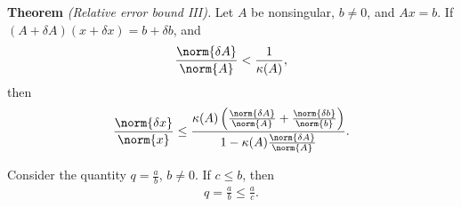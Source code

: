 \documentclass{report}
\title{\Huge{}}
\author{\huge{Nathan Warner}}
\date{\huge{}}
\begin{document}

    \bigbreak \noindent \bigbreak \noindent \bigbreak \noindent 
    \noindent \textbf{Theorem} \textit{\textit{(Relative error bound III).}}  Let $A$ be nonsingular, $b\ne 0$, and $Ax=b$. If $(A + \delta A)(x + \delta x) = b + \delta  b$, and 
        \begin{align*}
            \frac{\norm{\delta  A}}{\norm{A}} < \frac{1}{\kappa(A)},
        \end{align*}
        then
        \begin{align*}
            \frac{\norm{\delta x}}{\norm{x}} \leq \frac{\kappa(A)\left(\frac{\norm{\delta A}}{\norm{A}} + \frac{\norm{\delta b}}{\norm{b}}\right)}{1-\kappa(A)\frac{\norm{\delta A}}{\norm{A}}}
        .\end{align*}
        \bigbreak \noindent 
        \begin{remark}[a] Consider the quantity $q = \frac{a}{b}$, $b\ne 0$. If $c \leq b$, then 
            \begin{align*}
                q = \frac{a}{b} \leq \frac{a}{c}
            .\end{align*}
            
        \end{remark} 
        
\end{document}
